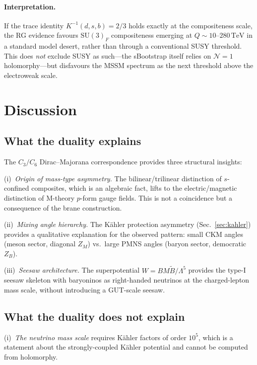 \documentclass[aps,prd,twocolumn,showpacs,preprintnumbers,superscriptaddress,floatfix]{revtex4-2}
\newcommand{\SU}{\mathrm{SU}}
\newcommand{\TeV}{\,\mathrm{TeV}}
\begin{document}
\paragraph{Interpretation.}
If the trace identity $K^{-1}(d,s,b) = 2/3$ holds exactly at the
compositeness scale, the RG evidence favours
$\SU(3)_F$ compositeness emerging at $Q \sim 10$--$280\TeV$
in a standard model desert, rather than through a conventional
SUSY threshold.
This does \emph{not} exclude SUSY as such---the sBootstrap itself
relies on $\mathcal{N}{=}1$ holomorphy---but disfavours the MSSM
spectrum as the next threshold above the electroweak scale.


\section{Discussion}
\label{sec:discussion}

\subsection{What the duality explains}

The $C_3/C_6$ Dirac--Majorana correspondence provides three
structural insights:

(i)~\emph{Origin of mass-type asymmetry.}
The bilinear/trilinear distinction of $s$-confined composites,
which is an algebraic fact, lifts to the electric/magnetic
distinction of M-theory $p$-form gauge fields.
This is not a coincidence but a consequence of the brane
construction.

(ii)~\emph{Mixing angle hierarchy.}
The K\"ahler protection asymmetry (Sec.~\ref{sec:kahler}) provides
a qualitative explanation for the observed pattern: small CKM
angles (meson sector, diagonal $Z_M$) vs.\ large PMNS angles
(baryon sector, democratic $Z_B$).

(iii)~\emph{Seesaw architecture.}
The superpotential $W = BM\tilde{B}/\Lambda^5$ provides the
type-I seesaw skeleton with baryoninos as right-handed neutrinos
at the charged-lepton mass scale, without introducing a GUT-scale
seesaw.

\subsection{What the duality does not explain}

(i)~\emph{The neutrino mass scale} requires K\"ahler factors of
order $10^5$, which is a statement about the strongly-coupled
K\"ahler potential and cannot be computed from holomorphy.
\end{document}
